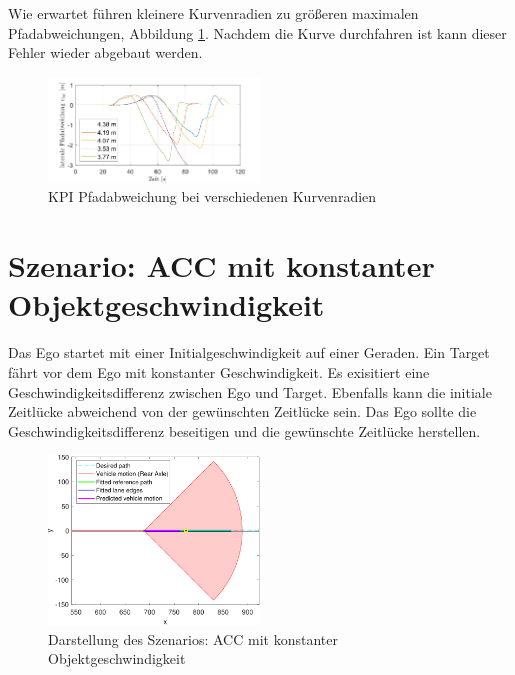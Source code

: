\noindent Wie erwartet führen kleinere Kurvenradien zu größeren maximalen Pfadabweichungen, Abbildung \ref{fig:Curve_negative_s-Error}. Nachdem die Kurve durchfahren ist kann dieser Fehler wieder abgebaut werden.
\begin{figure}[ht]
    \centering
    \includegraphics[width=0.5\textwidth]{figures/3_Implementierung/Curve_negative/Curve_negative_s-Error.pdf}
    \caption{KPI Pfadabweichung bei verschiedenen Kurvenradien}
    \label{fig:Curve_negative_s-Error}
\end{figure}

\section{Szenario: ACC mit konstanter Objektgeschwindigkeit} \label{sec:acc_vel_const}
Das Ego startet mit einer Initialgeschwindigkeit auf einer Geraden. Ein Target fährt vor dem Ego mit konstanter Geschwindigkeit. Es exisitiert eine Geschwindigkeitsdifferenz zwischen Ego und Target. Ebenfalls kann die initiale Zeitlücke abweichend von der gewünschten Zeitlücke sein. Das Ego sollte die Geschwindigkeitsdifferenz beseitigen und die gewünschte Zeitlücke herstellen.
\begin{figure}[ht]
    \centering
    \includegraphics[width=0.5\textwidth]{figures/3_Implementierung/ACC_Vel_Const/test_ACC_Vel_Const_depiction.pdf}
    \caption{Darstellung des Szenarios: ACC mit konstanter Objektgeschwindigkeit}
    \label{fig:test_ACC_Vel_Const_depiction}
\end{figure}

